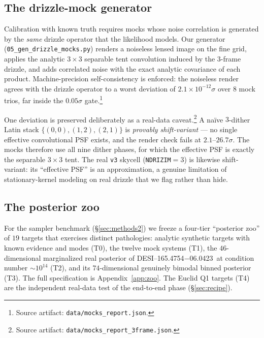 \documentclass[11pt,letterpaper]{article}
\newcommand{\foundry}{DESI--165.4754$-$06.0423}
\newcommand{\art}[1]{\footnote{Source artifact: \texttt{#1}.}}
\newcommand{\dfile}[1]{\texttt{#1}}
\begin{document}
\subsection{The drizzle-mock generator}
\label{sec:mocks-gen}

Calibration with known truth requires mocks whose noise correlation is
generated by the {\it same} drizzle operator that the likelihood models. Our
generator (\dfile{05\_gen\_drizzle\_mocks.py}) renders a noiseless lensed
image on the fine grid, applies the analytic $3\times3$ separable tent
convolution induced by the $3$-frame drizzle, and adds correlated noise with
the exact analytic covariance of each product. Machine-precision self-consistency
is enforced: the noiseless render agrees with the drizzle operator to a worst
deviation of $2.1\times10^{-12}\sigma$ over $8$ mock trios, far inside the
$0.05\sigma$ gate.\art{data/mocks\_report.json}

One deviation is preserved deliberately as a real-data caveat.\art{data/mocks\_report\_3frame.json}
A na\"ive $3$-dither Latin stack $\{(0,0),(1,2),(2,1)\}$ is {\it provably
shift-variant} --- no single effective convolutional PSF exists, and the
render check fails at $2.1$--$26.7\sigma$. The mocks therefore use all nine
dither phases, for which the effective PSF is exactly the separable $3\times3$
tent. The real \dfile{v3} skycell (\texttt{NDRIZIM}$=3$) is likewise
shift-variant: its ``effective PSF'' is an approximation, a genuine limitation
of stationary-kernel modeling on real drizzle that we flag rather than hide.

\subsection{The posterior zoo}
\label{sec:zoo-data}

For the sampler benchmark (\S\ref{sec:methods2}) we freeze a four-tier
``posterior zoo'' of $19$ targets that exercises distinct pathologies:
analytic synthetic targets with known evidence and modes (T0), the twelve
\citet{gu2022gigalens} mock systems (T1), the $46$-dimensional
marginalized real posterior of \foundry\ at condition number $\sim$$10^{14}$
(T2), and its $74$-dimensional genuinely bimodal binned posterior (T3). The
full specification is Appendix~\ref{app:zoo}. The Euclid Q1 targets (T4)
\citep{euclidq1_slde_2025} are the independent real-data test of the end-to-end
phase (\S\ref{sec:recipe}).

\end{document}
